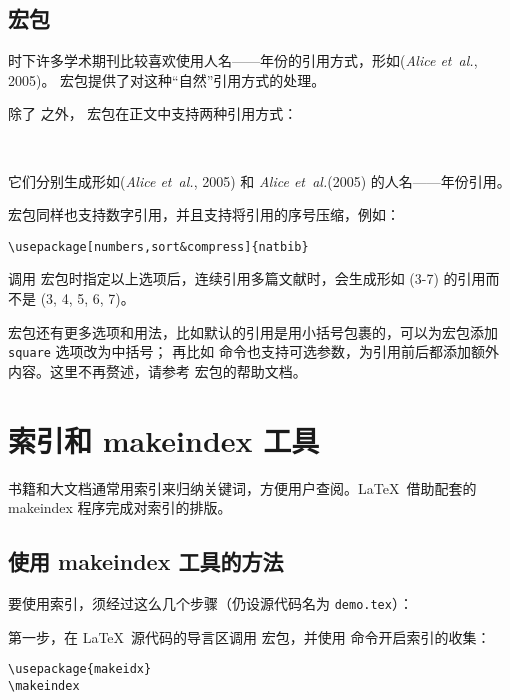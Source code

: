 \subsection{ 宏包}

时下许多学术期刊比较喜欢使用人名——年份的引用方式，形如(\emph{Alice et~al.}, 2005)。
 宏包提供了对这种“自然”引用方式的处理。

除了  之外， 宏包在正文中支持两种引用方式：
\begin{command}
 \\
\end{command}

它们分别生成形如(\emph{Alice et~al.}, 2005) 和 \emph{Alice et~al.}(2005) 的人名——年份引用。

 宏包同样也支持数字引用，并且支持将引用的序号压缩，例如：
\begin{verbatim}
\usepackage[numbers,sort&compress]{natbib}
\end{verbatim}
调用  宏包时指定以上选项后，连续引用多篇文献时，会生成形如 (3-7) 的引用而不是 (3, 4, 5, 6, 7)。

 宏包还有更多选项和用法，比如默认的引用是用小括号包裹的，可以为宏包添加 \texttt{square} 选项改为中括号；
再比如  命令也支持可选参数，为引用前后都添加额外内容。这里不再赘述，请参考  宏包的帮助文档。

\section{索引和 makeindex 工具}\label{sec:index}

书籍和大文档通常用索引来归纳关键词，方便用户查阅。\LaTeX\ 借助配套的 makeindex 程序完成对索引的排版。

\subsection{使用 makeindex 工具的方法}\label{subsec:makeidx}

要使用索引，须经过这么几个步骤（仍设源代码名为 \texttt{demo.tex}）：

第一步，在 \LaTeX\ 源代码的导言区调用  宏包，并使用  命令开启索引的收集：
\begin{verbatim}
\usepackage{makeidx}
\makeindex
\end{verbatim}

